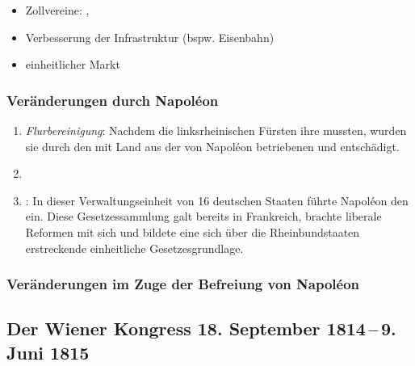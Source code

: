 \begin{itemize}
\item Zollvereine: ,
\item Verbesserung der Infrastruktur (bspw. Eisenbahn) 
\item einheitlicher Markt
\end{itemize}


\subsubsection{Veränderungen durch
Napol\'eon}
\label{sss:veraend-nap}

\begin{enumerate}
\item \emph{Flurbereinigung}:
Nachdem die linksrheinischen Fürsten ihre  mussten, wurden sie durch den
 mit Land aus der von
Napol\'eon betriebenen  und 
entschädigt.

\item {}

\item {}:
In dieser Verwaltungseinheit von 16 deutschen Staaten führte Napol\'eon 
den  ein. Diese Gesetzessammlung galt bereits in
Frankreich, brachte liberale Reformen mit sich und bildete eine sich
über die Rheinbundstaaten erstreckende einheitliche Gesetzesgrundlage.
\end{enumerate}


\subsubsection{Veränderungen im Zuge der Befreiung von Napol\'eon}


\subsection[Der Wiener Kongress 18. September 1814\,--\,9. Juni
1815]{Der Wiener Kongress 18. September 1814\,--\,9. Juni
1815\,}


